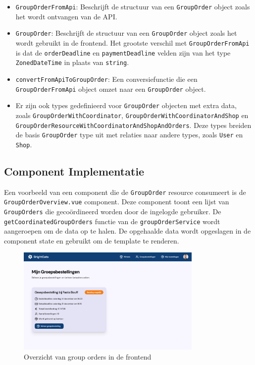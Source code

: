 \begin{itemize}
\item \texttt{GroupOrderFromApi}: Beschrijft de structuur van een \texttt{GroupOrder} object zoals het wordt ontvangen van de API.
\item \texttt{GroupOrder}: Beschrijft de structuur van een \texttt{GroupOrder} object zoals het wordt gebruikt in de frontend. Het grootste verschil met \texttt{GroupOrderFromApi} is dat de \texttt{orderDeadline} en \texttt{paymentDeadline} velden zijn van het type \texttt{ZonedDateTime} in plaats van \texttt{string}.
\item \texttt{convertFromApiToGroupOrder}: Een conversiefunctie die een \texttt{GroupOrderFromApi} object omzet naar een \texttt{GroupOrder} object.
\item Er zijn ook types gedefinieerd voor \texttt{GroupOrder} objecten met extra data, zoals \texttt{GroupOrderWithCoordinator}, \texttt{GroupOrderWithCoordinatorAndShop} en \texttt{GroupOrderResourceWithCoordinatorAndShopAndOrders}. Deze types breiden de basis \texttt{GroupOrder} type uit met relaties naar andere types, zoals \texttt{User} en \texttt{Shop}.
\end{itemize}

\subsection{Component Implementatie}

Een voorbeeld van een component die de \texttt{GroupOrder} resource consumeert is de \texttt{GroupOrderOverview.vue} component. Deze component toont een lijst van \texttt{GroupOrders} die gecoördineerd worden door de ingelogde gebruiker. De \texttt{getCoordinatedGroupOrders} functie van de \texttt{groupOrderService} wordt aangeroepen om de data op te halen. De opgehaalde data wordt opgeslagen in de component state en gebruikt om de template te renderen.

\begin{figure}[H]
\centering
\includegraphics[width=0.8\textwidth]{my-group-orders-page.png}
\caption{Overzicht van group orders in de frontend}
\label{fig:group_orders_overview}
\end{figure}

